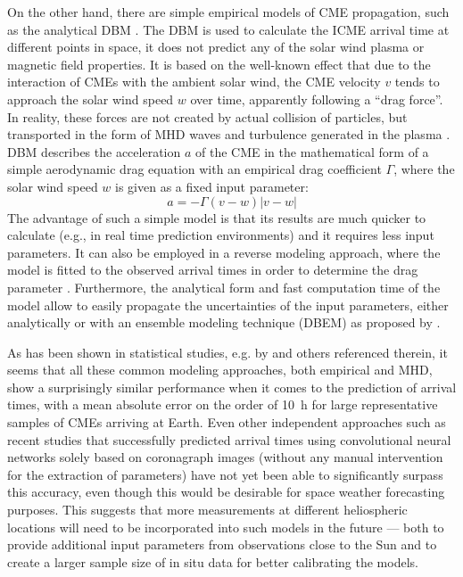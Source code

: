 On the other hand, there are simple empirical models of \ac{CME} propagation, such as the analytical \acl{DBM} \citep[\acs{DBM},][]{Vrsnak-2013}. The \ac{DBM} is used to calculate the \ac{ICME} arrival time at different points in space, it does not predict any of the solar wind plasma or magnetic field properties. It is based on the well-known effect that due to the interaction of \acp{CME} with the ambient solar wind, the \ac{CME} velocity $v$ tends to approach the solar wind speed $w$ over time, apparently following a ``drag force''. In reality, these forces are not created by actual collision of particles, but transported in the form of \ac{MHD} waves and turbulence generated in the plasma \citep[see e.g.][for details]{Cargill-1996,Owens-2004}. \ac{DBM} describes the acceleration $a$ of the \ac{CME} in the mathematical form of a simple aerodynamic drag equation with an empirical drag coefficient $\Gamma$, where the solar wind speed $w$ is given as a fixed input parameter:
\begin{equation}
    a = -\Gamma (v-w) |v-w|
\end{equation}
The advantage of such a simple model is that its results are much quicker to calculate (e.g., in real time prediction environments) and it requires less input parameters. It can also be employed in a reverse modeling approach, where the model is fitted to the observed arrival times in order to determine the drag parameter \citep{Zic-2015}. Furthermore, the analytical form and fast computation time of the model allow to easily propagate the uncertainties of the input parameters, either analytically or with an ensemble modeling technique (DBEM) as proposed by \citet{Dumbovic-2018}.

As has been shown in statistical studies, e.g. by \citet{Vrsnak-2014,Dumbovic-2018} and others referenced therein, it seems that all these common modeling approaches, both empirical and \ac{MHD}, show a surprisingly similar performance when it comes to the prediction of arrival times, with a mean absolute error on the order of \SI{10}{\hour} for large representative samples of \acp{CME} arriving at Earth. Even other independent approaches such as recent studies that successfully predicted arrival times using convolutional neural networks solely based on coronagraph images (without any manual intervention for the extraction of parameters) \citep{Wang-2019} have not yet been able to significantly surpass this accuracy, even though this would be desirable for space weather forecasting purposes. This suggests that more measurements at different heliospheric locations will need to be incorporated into such models in the future --- both to provide additional input parameters from observations close to the Sun and to create a larger sample size of in situ data for better calibrating the models.

